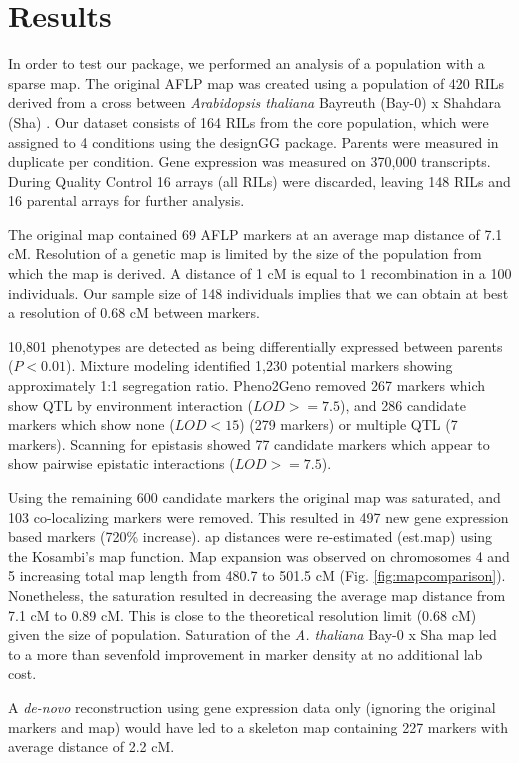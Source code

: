 \section{Results}
In order to test our package, we performed an analysis of a population with a sparse map.
The original AFLP map was created using a population of 420 RILs derived from a cross between 
\emph{Arabidopsis thaliana} Bayreuth (Bay-0) x Shahdara (Sha) \cite{Loudet:2002}. 
Our dataset consists of 164 RILs from the core population, which were assigned to 4 conditions 
using the designGG package\cite{Li:2009}. Parents were measured in duplicate per condition. 
Gene expression was measured on 370,000 transcripts. During Quality Control 16 arrays 
(all RILs) were discarded, leaving 148 RILs and 16 parental arrays for further analysis.

The original map contained 69 AFLP markers at an average map distance of 7.1 cM\cite{Loudet:2002}. 
Resolution of a genetic map is limited by the size of the population from which the map is derived. 
A distance of 1 cM is equal to 1 recombination in a 100 individuals. Our sample size of 148 
individuals implies that we can obtain at best a resolution of 0.68 cM between markers.

10,801 phenotypes are detected as being differentially expressed between parents 
($P < 0.01$). Mixture modeling identified 1,230 potential markers showing approximately 1:1 
segregation ratio. Pheno2Geno removed 267 markers which show QTL by environment interaction
($LOD >= 7.5$), and 286 candidate markers which show none ($LOD < 15$) (279 markers) or 
multiple QTL (7 markers). Scanning for epistasis showed 77 candidate markers which appear to 
show pairwise epistatic interactions ($LOD >= 7.5$). 

Using the remaining 600 candidate markers the original map was saturated, and 103 co-localizing 
markers were removed. This resulted in 497 new gene expression based markers (720\% increase). 
ap distances were re-estimated (est.map) using the Kosambi's map function. Map expansion was 
observed on chromosomes 4 and 5 increasing total map length from 480.7 to 501.5 
cM (Fig. \ref{fig:mapcomparison}). Nonetheless, the saturation resulted in decreasing the average map distance 
from 7.1 cM to 0.89 cM. This is close to the theoretical resolution limit (0.68 cM) given 
the size of population. Saturation of the \emph{A. thaliana} Bay-0 x Sha map led to a more 
than sevenfold improvement in marker density at no additional lab cost. 

A \emph{de-novo} reconstruction using gene expression data only (ignoring the original 
markers and map) would have led to a skeleton map containing 227 markers with average 
distance of 2.2 cM. 

